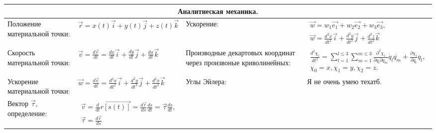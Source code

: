 \documentclass{article}
\begin{document}
\begin{tabular}{ |p{3.8cm}|p{5.7cm}|p{3.8cm}|p{5.7cm}|  }
\hline
\multicolumn{4}{|c|}{Аналитиеская механика.} \\
\hline
Положение материальной точки:                                                &  %
$\vec{r} = x(t) \vec{i} + y(t) \vec{j} + z(t) \vec{k}$                       &  %
Ускорение:                                                                   &  %
$\begin{aligned}
\vec{w} = w_1 \vec{e_1} + w_2 \vec{e_2} + w_3 \vec{e_3},               \\
\vec{w} = \frac{d^2 x}{d t^2} \vec{i} + \frac{d^2 y}{d t^2} \vec{j} +
\frac{d^2 z}{d t^2} \vec{k}
\end{aligned}$                                                               \\ %
\hline
Скорость материальной точки:                                                 &  %
$\vec{v} = \frac{d{\vec{r}}}{dt} =
\frac{dx}{dt} \vec{i} + \frac{dy}{dt} \vec{j} + \frac{dx}{dt} \vec{k}$       &  %
Производные декартовых координат через произвоные криволинейных:             &  %
$\begin{aligned}
\frac{d^2 \chi_i}{d t^2} = \sum_{l=1}^{l \leq 3} \sum_{m=1}^{m \leq 3}
\frac{\partial^2 \chi_i}{\partial q_l \partial q_m}
\dot{q_l} \dot{q_m} + \frac{\partial \chi_i}{\partial q_l} \ddot{q_l},  \\
\chi_0 = x, \chi_1 = y, \chi_2 = z.
\end{aligned}$                                                               \\ %
\hline
Ускорение материальной точки:                                                &  %
$\vec{w} = \frac{d{\vec{v}}}{dt} =
\frac{d^2 x}{dt^2} \vec{i} +
\frac{d^2 y}{dt^2} \vec{j} + \frac{d^2 x}{dt^2} \vec{k}$                     &  %
Углы Эйлера:                                                                 &  %
Я не очень умею техатб.                                                      \\ %
\hline
Вектор $\vec{\tau}$, определение:                                            &  %
$\begin{aligned}
\vec{v} = \frac{d}{dt} \vec{r[s(t)]} =
\frac{d\vec{r}}{ds} \frac{ds}{dt} = \vec{\tau} \frac{ds}{dt},   \\
\vec{\tau} = \frac{d\vec{r}}{ds}
\end{aligned}$                                                               &  %

\end{tabular}
\end{document}
